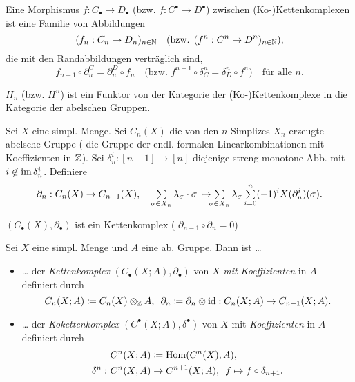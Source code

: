 \documentclass{cheat-sheet}
\newcommand{\nspace}[1]{\foreach \i in {1,...,#1}{ \! }} %
\newcommand{\CC}[1]{{#1}_{\bullet}} %
\newcommand{\CCC}[1]{{#1}^{\bullet}} %
\begin{document}
\begin{defn}
  Eine Morphismus $f : \CC{C} \to \CC{D}$ (bzw. $f : \CCC{C} \to \CCC{D}$) zwischen (Ko-)Kettenkomplexen ist eine Familie von Abbildungen
  \[
    (f_n : C_n \to D_n)_{n \in \mathbb{N}} \quad
    \text{(bzw. $(f^n : C^n \to D^n)_{n \in \mathbb{N}}$),}
  \]
  die mit den Randabbildungen verträglich sind, \dh{}
  \[
    f_{n-1} \circ \partial^C_n = \partial^D_n \circ f_n \quad
    \text{(bzw. $f^{n+1} \circ \delta_C^n = \delta_D^n \circ f^n$)} \quad
    \text{für alle $n$.}
  \]
\end{defn}

\begin{prop}
  $H_n$ (bzw. $H^n$) ist ein Funktor von der Kategorie der (Ko-)Kettenkomplexe in die Kategorie der abelschen Gruppen.
\end{prop}

\begin{defn}
  Sei $X$ eine simpl. Menge. Sei $C_n(X)$ die von den $n$-Simplizes $X_n$ erzeugte abelsche Gruppe (\dh{} die Gruppe der endl. formalen Linearkombinationen mit Koeffizienten in $\mathbb{Z}$). Sei $\delta_n^i : [n{-}1] \to [n]$ diejenige streng monotone Abb. mit $i \not\in \operatorname{im} \delta_n^i$. Definiere
  \[
    \partial_n : C_n(X) \to C_{n-1}(X), \quad
    \sum_{\sigma \in X_n} \lambda_\sigma \cdot \sigma \, \mapsto \nspace{3} \sum_{\sigma \in X_n} \lambda_\sigma \sum_{i=0}^n (-1)^i X(\partial_n^i)(\sigma).
  \]
\end{defn}

\begin{prop}
  $(C_\bullet(X),\partial_\bullet)$ ist ein Kettenkomplex (\dh{} $\partial_{n-1} \circ \partial_n = 0$)
\end{prop}

\begin{defn}
  Sei $X$ eine simpl. Menge und $A$ eine ab. Gruppe. Dann ist \ldots
  \begin{itemize}
    \item \ldots{} der \emph{Kettenkomplex} $(C_\bullet(X; A), \partial_\bullet)$ von $X$ \emph{mit Koeffizienten} in $A$ definiert durch
    \[
      C_n(X; A) \coloneqq C_n(X) \otimes_{\mathbb{Z}} A, \enspace
      \partial_n \coloneqq \partial_n \otimes \operatorname{id} : C_n(X; A) \to C_{n-1}(X; A).
    \]
    \item \ldots{} der \emph{Kokettenkomplex} $(C^\bullet(X; A), \delta^\bullet)$ von $X$ mit \emph{Koeffizienten} in $A$ definiert durch
    \begin{align*}
      & C^n(X; A) \coloneqq \operatorname{Hom}(C^n(X), A), \\
      \delta^n : \,\, & C^n(X; A) \to C^{n+1}(X; A), \enspace f \mapsto f \circ \delta_{n+1}.
    \end{align*}
  \end{itemize}
\end{defn}
\end{document}
